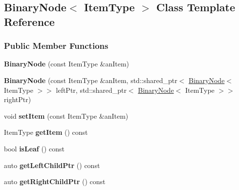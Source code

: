 \hypertarget{class_binary_node}{}\subsection{Binary\+Node$<$ Item\+Type $>$ Class Template Reference}
\label{class_binary_node}
\subsubsection*{Public Member Functions}
\begin{DoxyCompactItemize}
\item 
{\bfseries Binary\+Node} (const Item\+Type \&an\+Item)\hypertarget{class_binary_node_aaa9cbfdb5d2325746fd7ab54b31cef68}{}\label{class_binary_node_aaa9cbfdb5d2325746fd7ab54b31cef68}

\item 
{\bfseries Binary\+Node} (const Item\+Type \&an\+Item, std\+::shared\+\_\+ptr$<$ \hyperlink{class_binary_node}{Binary\+Node}$<$ Item\+Type $>$$>$ left\+Ptr, std\+::shared\+\_\+ptr$<$ \hyperlink{class_binary_node}{Binary\+Node}$<$ Item\+Type $>$$>$ right\+Ptr)\hypertarget{class_binary_node_a9bf9926064401ab103b38946c0e43f8a}{}\label{class_binary_node_a9bf9926064401ab103b38946c0e43f8a}

\item 
void {\bfseries set\+Item} (const Item\+Type \&an\+Item)\hypertarget{class_binary_node_ab731c8cf87040e19ecba80f407b4d9b1}{}\label{class_binary_node_ab731c8cf87040e19ecba80f407b4d9b1}

\item 
Item\+Type {\bfseries get\+Item} () const \hypertarget{class_binary_node_a7ebe5ba53f6bad2bd2c37ab37c50b3b0}{}\label{class_binary_node_a7ebe5ba53f6bad2bd2c37ab37c50b3b0}

\item 
bool {\bfseries is\+Leaf} () const \hypertarget{class_binary_node_ad6531b0b6b2c0023340c5b23e7b2e598}{}\label{class_binary_node_ad6531b0b6b2c0023340c5b23e7b2e598}

\item 
auto {\bfseries get\+Left\+Child\+Ptr} () const \hypertarget{class_binary_node_a8ac26a806d8f7aad06bab1920c09dce0}{}\label{class_binary_node_a8ac26a806d8f7aad06bab1920c09dce0}

\item 
auto {\bfseries get\+Right\+Child\+Ptr} () const \hypertarget{class_binary_node_ab48a9a56f1afb72d4b959791adbc148a}{}\label{class_binary_node_ab48a9a56f1afb72d4b959791adbc148a}


\end{DoxyCompactItemize}
